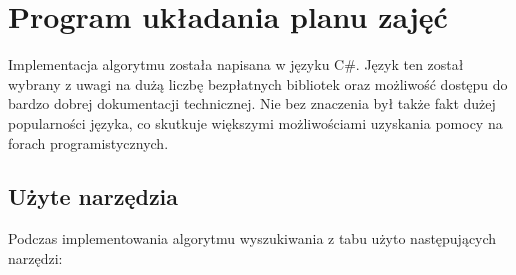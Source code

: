 \chapter{Program układania planu zajęć}

Implementacja algorytmu została napisana w języku C\#. Język ten został wybrany z uwagi na dużą liczbę bezpłatnych bibliotek oraz możliwość dostępu do bardzo dobrej dokumentacji technicznej. Nie bez znaczenia był także fakt dużej popularności języka, co skutkuje większymi możliwościami uzyskania pomocy na forach programistycznych.

\section{Użyte narzędzia}

Podczas implementowania algorytmu wyszukiwania z tabu użyto następujących narzędzi:


